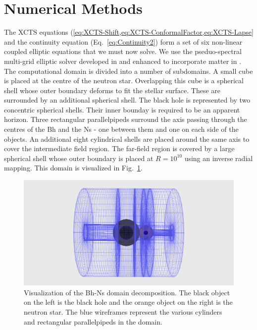 \section{Numerical Methods}
\label{sec:BhNSNumMethods}
The XCTS equations
(\cref{eq:XCTS-Shift,eq:XCTS-ConformalFactor,eq:XCTS-Lapse} and the
continuity equation (Eq.~\ref{eq:Continuity2}) form a set
of six non-linear coupled elliptic equations that we must now solve. We use the
pseduo-spectral multi-grid elliptic solver developed in
\cite{Pfeiffer2003} and enhanced to
incorporate matter in \cite{FoucartEtAl:2008}. The computational domain is divided into a number
of subdomains. A small cube is placed at the centre of the neutron star. Overlapping this cube is a spherical shell whose outer boundary deforms to fit the stellar surface. These are surrounded by an additional spherical shell. The black hole is represented by two concentric spherical shells. Their inner bounday is required to be an apparent horizon. Three rectangular parallelpipeds surround the axis passing through the centres of the Bh and the Ns - one between them and one on each side of the objects. An additional eight cylindrical shells are placed around the same axis to cover the intermediate field region. The far-field region is covered by a large spherical shell whose outer boundary is placed at $R=10^{10}$ using an inverse radial mapping. This domain is visualized in Fig.~\ref{fig:BhNsDomain}.
\begin{center}
\begin{figure}
\includegraphics[scale=0.45]{chap4/BhNsDomain.png}
\caption[Visualization of the Bh-Ns domain
decomposition.]{Visualization of the Bh-Ns domain decomposition. The
  black object on the left is the black hole and the orange object on
  the right is the neutron star. The blue wireframes represent the
  various cylinders and rectangular parallelpipeds in the
  domain. }
\label{fig:BhNsDomain}
\end{figure}
\end{center}
